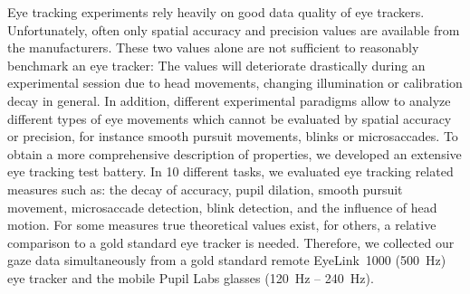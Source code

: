Eye tracking experiments rely heavily on good data quality of eye trackers. 
Unfortunately, often only spatial accuracy and precision values are available from the manufacturers.
These two values alone are not sufficient to reasonably benchmark an eye tracker:
The values will deteriorate drastically during an experimental session due to head movements, changing illumination or calibration decay in general. In addition, different experimental paradigms allow to analyze different types of eye movements which cannot be evaluated by spatial accuracy or precision, for instance smooth pursuit movements, blinks or microsaccades.
To obtain a more comprehensive description of properties, we developed an extensive eye tracking test battery.
In 10 different tasks, we evaluated eye tracking related measures such as: the decay of accuracy, pupil dilation, smooth pursuit movement, microsaccade detection, blink detection, and the influence of head motion.
For some measures true theoretical values exist, for others, a relative comparison to a gold standard eye tracker is needed.
Therefore, we collected our gaze data simultaneously from a gold standard remote EyeLink~1000 (\SI{500}{\hertz}) eye tracker and the mobile Pupil Labs glasses (\SI{120}{\hertz} -- \SI{240}{\hertz}).